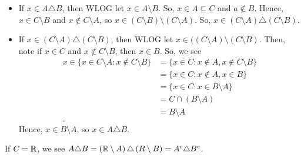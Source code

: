 \documentclass[a4paper]{article}
\begin{document}
\begin{solution}[20]
	\begin{itemize}
		\item If \(x \in A \triangle B\), then WLOG let \(x \in A \setminus B\). So, \(x \in A \subseteq C\) and \(a \not\in B\). Hence, \(x \in C \setminus B\) and \(x\not\in C \setminus A\), so \(x \in \left( C \setminus B \right) \setminus \left( C \setminus A \right) \). So, \(x \in \left( C \setminus A \right) \triangle \left( C \setminus B \right) \).
		\item If \(x \in \left( C \setminus A\right) \triangle \left( C \setminus B \right)  \), then WLOG let \(x \in (\left( C \setminus A \right) \setminus \left( C \setminus B \right) \). Then, note if \(x \in C\) and \(x \not\in C \setminus B\), then \(x \in B\). So, we see
			\begin{align*}
				x \in \{x \in C\setminus A : x \not\in C \setminus B\} &=  \{x \in C : x \not\in A, x \not\in C \setminus B\}  \\
				&= \{x \in C : x\not\in A, x \in B\} \\
				&= \{x \in C : x \in B \setminus A\}  \\
				&= C \cap (B\setminus A) \\
				&= B \setminus A \\
			.\end{align*}
			Hence, \(x \in B \setminus A\), so \(x \in  A \triangle B\).
	\end{itemize}
	If \(C = \mathbb{R}\), we see \(A \triangle B = \left( \mathbb{R} \setminus A \right) \triangle \left( R \setminus B \right) = A^{c} \triangle B^{c}\).
\end{solution}
\newpage
\end{document}
